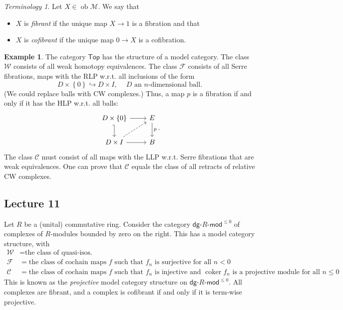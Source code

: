 \documentclass[10pt,letterpaper,cm]{nupset}
\theoremstyle{definition}
\newtheorem{exmp}[defn]{Example}
\theoremstyle{theorem}
\theoremstyle{remark}
\newtheorem*{term}{Terminology}
\newcommand{\1}{\mathbb{1}}
\newcommand{\cf}{\mathscr{C}}
\newcommand{\f}{\mathscr{F}}
\newcommand{\m}{\mathcal{M}}
\newcommand{\w}{\mathscr{W}}
\newcommand{\dg}{\mathsf{dg}}
\newcommand{\0}{\vec 0}
\DeclareMathOperator{\ob}{ob}
\DeclareMathOperator{\coker}{coker}
\newcommand{\bi}{\begin{itemize}}
\newcommand{\ei}{\end{itemize}}
\begin{document}
\smallskip

\begin{term} 
Let $X \in \ob{\m}$. We say that
\bi
\item  $X$ is \textit{fibrant} if the unique map $X \to 1$ is a fibration and that
\item $X$ is \textit{cofibrant} if the unique map $0 \to X$ is a cofibration. 
\ei
\end{term}

\begin{exmp}
The category $\mathsf{Top}$ has the structure of a model category. The class $\w$ consists of all weak homotopy equivalences. The class $\f$ consists of all Serre fibrations, maps with the RLP w.r.t. all inclusions of the form 
\[
D \times \left\{0\right\} \hookrightarrow D \times I, \ \quad \text{$D$ an $n$-dimensional ball}.
\] (We could replace balls with CW complexes.) Thus, a map $p$ is a fibration if and only if it has the HLP w.r.t. all balls:
\[
\begin{tikzcd}
	{D\times \left\{0\right\}} & E \\
	{D\times I} & B
	\arrow[hook', from=1-1, to=2-1]
	\arrow[from=1-1, to=1-2]
	\arrow[from=2-1, to=2-2]
	\arrow["p", from=1-2, to=2-2]
	\arrow[dashed, from=2-1, to=1-2]
\end{tikzcd}
.\]
The class $\cf$ must consist of all maps with the LLP w.r.t. Serre fibrations that are weak equivalences. One can prove that $\cf$ equals the class of all retracts of relative CW complexes.  
\end{exmp}

\subsection{Lecture 11}

Let $R$ be a (unital) commutative ring. Consider the category $\dg{\text{-}}R{\text{-}}\mathsf{mod}^{\leq 0}$ of complexes of $R$-modules bounded by zero on the right. This has a model category structure, with
\begin{align*}
\w & = \text{the class of quasi-isos.}
\\ \f & = \text{the class of cochain maps $f$ such that $f_n$ is surjective for all $n<0$}
\\ \cf & =  \text{the class of cochain maps $f$ such that $f_n$ is injective  and $\coker{f_n}$ is a projective module for all $n\leq 0$}
. 
\end{align*}
This is known as the \textit{projective} model category structure on $\dg{\text{-}}R{\text{-}}\mathsf{mod}^{\leq 0}$. All complexes are fibrant, and a complex is cofibrant if and only if it is term-wise projective.
\end{document}

